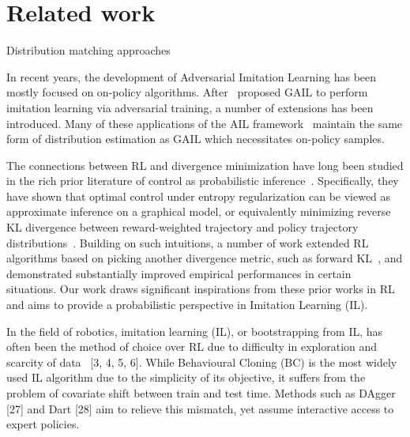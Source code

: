 \section{Related work}
Distribution matching approaches 

In recent years, the development of Adversarial Imitation Learning has been mostly focused on on-policy algorithms. 
After~\citet{ho2016generative} proposed GAIL to perform imitation learning via adversarial training, a number of extensions has been introduced. 
Many of these applications of the AIL framework~\citep{li2017infogail,hausman2017multi,sun2019adversarial} maintain the same form of distribution estimation as GAIL which necessitates on-policy samples. 


The connections between RL and divergence minimization have long been studied in the rich prior literature of control as probabilistic inference~\citep{todorov2007linearly,toussaint2009robot,peters2010relative,kappen2012optimal}. 
Specifically, they have shown that optimal control under entropy regularization can be viewed as approximate inference on a graphical model, or equivalently minimizing reverse KL divergence between reward-weighted trajectory and policy trajectory distributions~\citep{kappen2012optimal,levine2018reinforcement}.
Building on such intuitions, a number of work extended RL algorithms based on picking another divergence metric, such as forward KL~\citep{peters2007reinforcement,norouzi2016reward}, and demonstrated substantially improved empirical performances in certain situations. 
Our work draws significant inspirations from these prior works in RL and aims to provide a probabilistic perspective in Imitation Learning (IL).

In the field of robotics, imitation learning (IL), or bootstrapping from IL, has often been the method of choice over RL due to difficulty in exploration and scarcity of data~\citep{} [3, 4, 5, 6]. 
While Behavioural Cloning (BC) is the most widely used IL algorithm due to the simplicity of its objective, it suffers from the problem of covariate shift between train and test time. 
Methods such as DAgger [27] and Dart [28] aim to relieve this mismatch, yet assume interactive access to expert policies.


